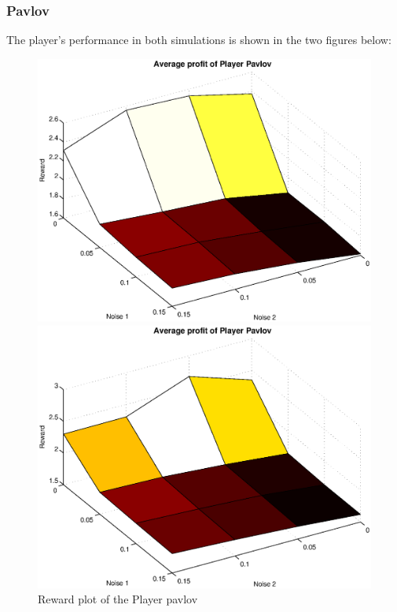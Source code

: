 \documentclass[11pt,twoside]{article}
\begin{document}
\subsubsection{Pavlov}
The player's performance in both simulations is shown in the two figures below:
\begin{figure}[h]

\begin{minipage}[hbt]{0.65\textwidth}
	\centering
	\includegraphics[width=\textwidth]{pics/simulation1/Reward_vs_Noise_of_Player_Pavlov}
\end{minipage}
\hfill
\begin{minipage}[hbt]{0.3\textwidth}
	\centering
	\includegraphics[width=\textwidth]{pics/simulation2/Reward_vs_Noise_of_Player_Pavlov}
\end{minipage}
	\caption{Reward plot of the Player pavlov}
	\label{pic player pavlov}
\end{figure}
\end{document}
